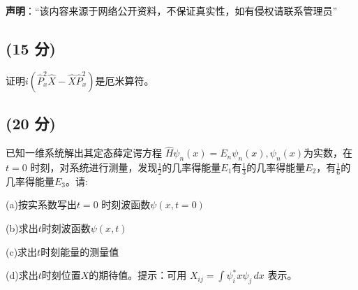 
\textbf{声明}：“该内容来源于网络公开资料，不保证真实性，如有侵权请联系管理员”

\subsection{(15 分)}
证明$i\left(\hat{P}_x^2\hat{X} - \hat{X}\hat{P}_x^2\right)$是厄米算符。
\subsection{(20 分)}
已知一维系统解出其定态薛定谔方程 $\hat{H} \psi_n(x) = E_n \psi_n(x), \psi_n(x)$为实数，在 $t=0$ 时刻，对系统进行测量，发现$\frac{1}{2}$的几率得能量$E_1$有$\frac{1}{3}$的几率得能量$E_2$，有$\frac{1}{6}$的几率得能量$E_3$。请:

(a)按实系数写出$t=0$ 时刻波函数$\psi(x, t=0)$

(b)求出$t$时刻波函数$\psi(x, t)$

(c)求出$t$时刻能量的测量值

(d)求出$t$时刻位置$X$的期待值。提示：可用  $X_{ij} = \int \psi_i^* x \psi_j \, dx$ 表示。
